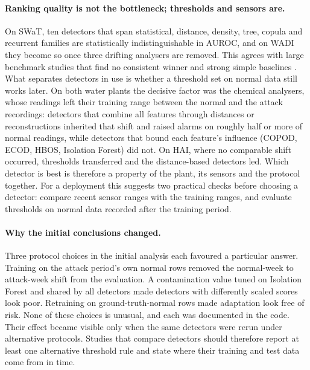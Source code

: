 \documentclass[11pt]{article}
\begin{document}
\paragraph{Ranking quality is not the bottleneck; thresholds and sensors are.}
On SWaT, ten detectors that span statistical, distance, density, tree, copula and
recurrent families are statistically indistinguishable in AUROC, and on WADI they become
so once three drifting analysers are removed. This agrees with large benchmark studies
that find no consistent winner and strong simple baselines
\citep{audibert2022,sarfraz2024}. What separates detectors in use is whether a threshold
set on normal data still works later. On both water plants the decisive factor was the
chemical analysers, whose readings left their training range between the normal and the
attack recordings: detectors that combine all features through distances or
reconstructions inherited that shift and raised alarms on roughly half or more of normal
readings, while detectors that bound each feature's influence (COPOD, ECOD, HBOS,
Isolation Forest) did not. On HAI, where no comparable shift occurred, thresholds
transferred and the distance-based detectors led. Which detector is best is therefore a
property of the plant, its sensors and the protocol together. For a deployment this
suggests two practical checks before choosing a detector: compare recent sensor ranges
with the training ranges, and evaluate thresholds on normal data recorded after the
training period.

\paragraph{Why the initial conclusions changed.} Three protocol choices in the
initial analysis each favoured a particular answer. Training on the attack period's
own normal rows removed the normal-week to attack-week shift from the evaluation.
A contamination value tuned on Isolation Forest and shared by all detectors made
detectors with differently scaled scores look poor. Retraining on
ground-truth-normal rows made adaptation look free of risk. None of these
choices is unusual, and each was documented in the code. Their effect became
visible only when the same detectors were rerun under alternative protocols.
Studies that compare detectors should therefore report at least one alternative
threshold rule and state where their training and test data come from in time.
\end{document}
